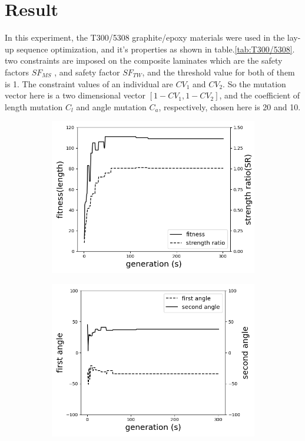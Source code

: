 \section{Result}
In this experiment, the T300/5308 graphite/epoxy materials were used in the
lay-up sequence optimization, and it's properties as shown in
table.\ref{tab:T300/5308}. two constraints are imposed on the composite
laminates which are the safety factors $SF_{MS}$ , and safety factor $SF_{TW}$,
and the threshold value for both of them is 1. The constraint values of an
individual are $CV_1$ and $CV_2$. So the mutation vector here is a two
dimensional vector $[1 - CV_1, 1 - CV_2 ]$, and the coefficient of length
mutation $C_l$ and angle mutation $C_a$, respectively, chosen here is 20 and 10. 

\begin{figure}[!t]
	\centering
		\begin{subfigure}[b]{0.8\linewidth}
			\includegraphics[width=\linewidth]{2020-11-10-pre-image/two_distinct_angle_fitness_and_sr.png}
		\end{subfigure}

		\begin{subfigure}[b]{0.8\linewidth}
			\includegraphics[width=\linewidth]{2020-11-10-pre-image/two_distinct_angle_angle_change.png}
		\end{subfigure}


\end{figure}
